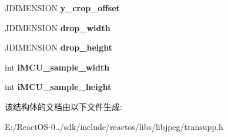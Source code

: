 \begin{DoxyCompactItemize}
\item 
\mbox{\label{structjpeg__transform__info_adeadce805b25751fd43263e2fcd2e166}} 
J\+D\+I\+M\+E\+N\+S\+I\+ON {\bfseries y\+\_\+crop\+\_\+offset}
\item 
\mbox{\label{structjpeg__transform__info_a6c63db1d6f705cc9e4bccd2efee11bde}} 
J\+D\+I\+M\+E\+N\+S\+I\+ON {\bfseries drop\+\_\+width}
\item 
\mbox{\label{structjpeg__transform__info_a4e51b93c0ac407e998e8d643465c48bb}} 
J\+D\+I\+M\+E\+N\+S\+I\+ON {\bfseries drop\+\_\+height}
\item 
\mbox{\label{structjpeg__transform__info_a6c67f5ce5320a5d532acd6a6df14f1f4}} 
int {\bfseries i\+M\+C\+U\+\_\+sample\+\_\+width}
\item 
\mbox{\label{structjpeg__transform__info_a6b6606b8e8315e161fda4ddb29b2d410}} 
int {\bfseries i\+M\+C\+U\+\_\+sample\+\_\+height}
\end{DoxyCompactItemize}


该结构体的文档由以下文件生成\+:\begin{DoxyCompactItemize}
\item 
E\+:/\+React\+O\+S-\/0../sdk/include/reactos/libs/libjpeg/transupp.\+h\end{DoxyCompactItemize}
